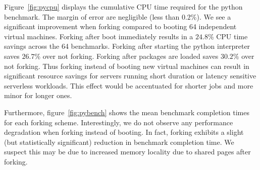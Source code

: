  Figure~\ref{fig:pycpu} displays the cumulative CPU
time required for the python benchmark. The margin of error are negligible
(less than $0.2$\%). We see a significant improvement when forking compared to
booting 64 independent virtual machines. Forking after boot immediately results
in a $24.8$\% CPU time savings across the 64 benchmarks. Forking after starting
the python interpreter saves $26.7$\% over not forking. Forking after packages
are loaded saves $30.2\%$ over not forking. Thus forking instead of booting new
virtual machines can result in significant resource savings for servers running
short duration or latency sensitive serverless workloads. This effect would be
accentuated for shorter jobs and more minor for longer ones.

Furthermore, figure~\ref{fig:pybench} shows the mean benchmark completion times
for each forking scheme. Interestingly, we do not observe any performance
degradation when forking instead of booting. In fact, forking exhibits a slight
(but statistically significant) reduction in benchmark completion time. We
suspect this may be due to increased memory locality due to shared pages after
forking.
